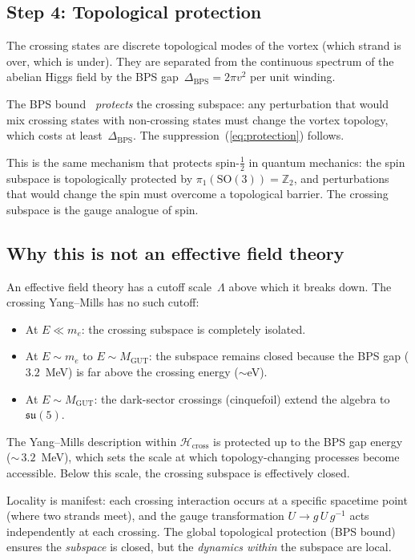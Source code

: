\documentclass[11pt]{article}
\newcommand{\su}{\mathfrak{su}}
\newcommand{\half}{\tfrac{1}{2}}
\begin{document}
\subsection{Step 4: Topological protection}

The crossing states are discrete topological modes of the vortex
(which strand is over, which is under).  They are separated from the
continuous spectrum of the abelian Higgs field by the BPS
gap~$\Delta_\text{BPS} = 2\pi v^2$ per unit winding.

The BPS bound~\cite{Bogomolny1976} \emph{protects} the crossing
subspace: any perturbation that would mix crossing states with
non-crossing states must change the vortex topology, which costs
at least~$\Delta_\text{BPS}$.  The suppression~(\ref{eq:protection})
follows.

This is the same mechanism that protects spin-$\half$ in quantum
mechanics: the spin subspace is topologically protected by
$\pi_1(\mathrm{SO}(3)) = \mathbb{Z}_2$, and perturbations that
would change the spin must overcome a topological barrier.  The
crossing subspace is the gauge analogue of spin.

\subsection{Why this is not an effective field theory}

An effective field theory has a cutoff scale~$\Lambda$ above which
it breaks down.  The crossing Yang--Mills has no such cutoff:
\begin{itemize}
\item At $E \ll m_e$: the crossing subspace is completely isolated.
\item At $E \sim m_e$ to $E \sim M_\text{GUT}$: the subspace remains
      closed because the BPS gap ($3.2$~MeV) is far above the
      crossing energy ($\sim$eV).
\item At $E \sim M_\text{GUT}$: the dark-sector crossings (cinquefoil)
      extend the algebra to $\su(5)$.
\end{itemize}
The Yang--Mills description within $\mathcal{H}_\text{cross}$ is
protected up to the BPS gap energy (${\sim}\,3.2$~MeV), which sets
the scale at which topology-changing processes become accessible.
Below this scale, the crossing subspace is effectively closed.

Locality is manifest: each crossing interaction occurs at a specific
spacetime point (where two strands meet), and the gauge transformation
$U \to g\,U\,g^{-1}$ acts independently at each crossing.  The global
topological protection (BPS bound) ensures the \emph{subspace} is
closed, but the \emph{dynamics within} the subspace are local.
\end{document}
